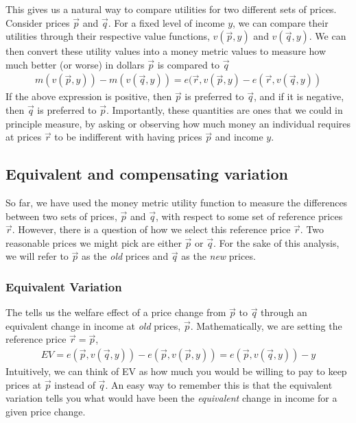 This gives us a natural way to compare utilities for two different sets of prices. Consider prices $\vec{p}$ and $\vec{q}$. For a fixed level of income $y$, we can compare their utilities through their respective value functions, $v(\vec{p}, y)$ and $v(\vec{q}, y)$. We can then convert these utility values into a money metric values to measure how much better (or worse) in dollars $\vec{p}$ is compared to $\vec{q}$
\begin{align*}
    m(v(\vec{p}, y)) - m(v(\vec{q}, y)) = e(\vec{r}, v(\vec{p}, y) - e(\vec{r}, v(\vec{q}, y))
\end{align*}
If the above expression is positive, then $\vec{p}$ is preferred to $\vec{q}$, and if it is negative, then $\vec{q}$ is preferred to $\vec{p}$. Importantly, these quantities are ones that we could in principle measure, by asking or observing how much money an individual requires at prices $\vec{r}$ to be indifferent with having prices $\vec{p}$ and income $y$. 

\subsection*{Equivalent and compensating variation}
So far, we have used the money metric utility function to measure the differences between two sets of prices, $\vec{p}$ and $\vec{q}$, with respect to some set of reference prices $\vec{r}$. However, there is a question of how we select this reference price $\vec{r}$. Two reasonable prices we might pick are either $\vec{p}$ or $\vec{q}$. For the sake of this analysis, we will refer to $\vec{p}$ as the \emph{old} prices and $\vec{q}$ as the \emph{new} prices.

\subsubsection*{Equivalent Variation}
The  tells us the welfare effect of a price change from $\vec{p}$ to $\vec{q}$ through an equivalent change in income at \emph{old} prices, $\vec{p}$. Mathematically, we are setting the reference price $\vec{r} = \vec{p}$,
\begin{align*}
    EV = e(\vec{p}, v(\vec{q}, y)) - e(\vec{p}, v(\vec{p}, y)) = e(\vec{p}, v(\vec{q}, y)) - y
\end{align*}
Intuitively, we can think of EV as how much you would be willing to pay to keep prices at $\vec{p}$ instead of $\vec{q}$. An easy way to remember this is that the equivalent variation tells you what would have been the \emph{equivalent} change in income for a given price change.

